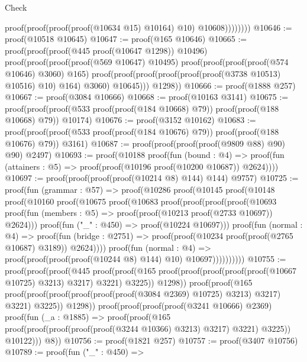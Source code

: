 \begin{lexlean}{Check}
\begin{coremodule}
                            proof(proof(proof(proof(@10634 @15) @10164) @10) @10608))))))))
@10646 := proof(@10518 @10645)
@10647 := proof(@165 @10646)
@10665 := proof(proof(proof(@445 proof(@10647 @1298)) @10496)
      proof(proof(proof(proof(@569 @10647) @10495)
            proof(proof(proof(proof(@574 @10646) @3060) @165)
                proof(proof(proof(proof(proof(proof(@3738 @10513) @10516) @10) @164) @3060)
                    @10645)))
          @1298))
@10666 := proof(@1888 @257)
@10667 := proof(@3084 @10666)
@10668 := proof(@10163 @3141)
@10675 := proof(proof(proof(@533 proof(proof(@184 @10668) @79)) proof(proof(@188 @10668) @79))
      @10174)
@10676 := proof(@3152 @10162)
@10683 := proof(proof(proof(@533 proof(proof(@184 @10676) @79)) proof(proof(@188 @10676) @79))
      @3161)
@10687 := proof(proof(proof(proof(@9809 @88) @90) @90) @2497)
@10693 := proof(@10188
      proof(fun (bound : @4) =>
        proof(fun (attainers : @5) => proof(proof(@10196 proof(@10200 @10687)) @2624))))
@10697 := proof(proof(proof(proof(@10214 @8) @144) @144) @9757)
@10725 := proof(fun (grammar : @57) =>
    proof(@10286
        proof(@10145
            proof(@10148
                proof(@10160
                    proof(@10675
                        proof(@10683
                            proof(proof(proof(proof(@10693
                                      proof(fun (members : @5) =>
                                        proof(proof(@10213 proof(@2733 @10697)) @2624)))
                                    proof(fun ("_" : @450) => proof(@10224 @10697)))
                                  proof(fun (normal : @4) =>
                                    proof(fun (bridge : @2751) =>
                                      proof(proof(@10234 proof(proof(@2765 @10687) @3189)) @2624))))
                                proof(fun (normal : @4) =>
                                  proof(proof(proof(proof(@10244 @8) @144) @10) @10697))))))))))
@10755 := proof(proof(proof(@445
          proof(proof(@165 proof(proof(proof(proof(proof(@10667 @10725) @3213) @3217) @3221) @3225))
              @1298))
        proof(proof(@165
              proof(proof(proof(proof(proof(proof(@3084 @2369) @10725) @3213) @3217) @3221) @3225))
            @1298))
      proof(proof(proof(proof(@3241 @10666) @2369)
            proof(fun (_a : @1885) =>
              proof(proof(@165
                    proof(proof(proof(proof(proof(@3244 @10366) @3213) @3217) @3221) @3225))
                  @10122)))
          @8))
@10756 := proof(@1821 @257)
@10757 := proof(@3407 @10756)
@10789 := proof(fun ("_" : @450) =>

\end{coremodule}
\end{lexlean}
